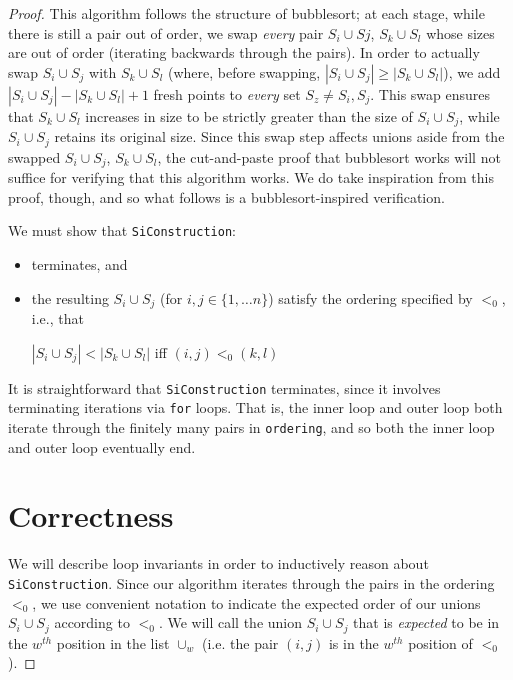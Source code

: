 \documentclass[12pt]{article}
\newcommand{\snote}[1]{{Sa\'ul: {{\color{blue}#1}}}}
\newcommand{\code}[1]{\colorbox{light-gray}{\texttt{#1}}}
\begin{document}
\begin{proof}
This algorithm follows the structure of bubblesort; at each stage, while there is still a pair out of order, we swap \textit{every} pair $S_i \cup Sj$, $S_k \cup S_l$ whose sizes are out of order (iterating backwards through the pairs).  In order to actually swap $S_i \cup S_j$ with $S_k \cup S_l$ (where, before swapping, $|S_i \cup S_j| \ge |S_k \cup S_l|$), we add $|S_i \cup S_j| - |S_k \cup S_l| + 1$ fresh points to \textit{every} set $S_z \ne S_i, S_j$.  This swap ensures that $S_k \cup S_l$ increases in size to be strictly greater than the size of $S_i \cup S_j$, while $S_i \cup S_j$ retains its original size.
Since this swap step affects unions aside from the swapped $S_i \cup S_j$, $S_k \cup S_l$, the cut-and-paste proof that bubblesort works will not suffice for verifying that this algorithm works.  We do take inspiration from this proof, though, and so what follows is a bubblesort-inspired verification.

We must show that \code{SiConstruction}:
\begin{itemize}
    \item terminates, and
    \item the resulting $S_i \cup S_j$ (for $i, j \in \{1, \ldots n\}$) satisfy the ordering specified by $<_0$, i.e., that 
    
    $|S_i \cup S_j| < |S_k \cup S_l|$ iff $(i, j) <_0 (k, l)$
\end{itemize}

It is straightforward that \code{SiConstruction} terminates, since it involves terminating iterations via \code{for} loops.  That is, the inner loop and outer loop both iterate through the finitely many pairs in \code{ordering}, and so both the inner loop and outer loop eventually end.

\section{Correctness}
We will describe loop invariants in order to inductively reason about \code{SiConstruction}.  Since our algorithm iterates through the pairs in the ordering $<_0$, we use convenient notation to indicate the expected order of our unions $S_i \cup S_j$ according to $<_0$.  We will call the union $S_i \cup S_j$ that is \textit{expected} to be in the $w^{th}$ position in the list $\cup_w$ (i.e. the pair $(i, j)$ is in the $w^{th}$ position of $<_0$).


\end{proof}
\end{document}

